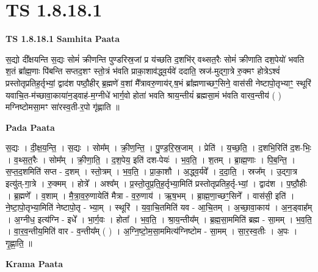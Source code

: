 \documentclass[17pt]{extarticle}
\begin{document}
\section{ TS 1.8.18.1 }

\textbf{TS 1.8.18.1 } \newline
\textbf{Samhita Paata} \newline

स॒द्यो दी᳚क्षयन्ति स॒द्यः सोमं॑ क्रीणन्ति पुण्डरिस्र॒जां प्र य॑च्छति द॒शभि॑र् वथ्सत॒रैः सोमं॑ क्रीणाति दश॒पेयो॑ भवति श॒तं ब्रा᳚ह्म॒णाः पि॑बन्ति सप्तद॒शꣳ स्तो॒त्रं भ॑वति प्राका॒शाव॑द्ध्व॒र्यवे॑ ददाति॒ स्रज॑-मुद्गा॒त्रे रु॒क्मꣳ होत्रेऽश्वं॑ प्रस्तोतृप्रतिह॒र्तृभ्यां॒ द्वाद॑श पष्ठौ॒हीर् ब्र॒ह्मणे॑ व॒शां मै᳚त्रावरु॒णाय॑र्.ष॒भं ब्रा᳚ह्मणाच्छꣳ॒॒सिने॒ वास॑सी नेष्टापो॒तृभ्याꣳ॒॒ स्थूरि॑ यवाचि॒त-म॑च्छावा॒काया॑न॒ड्वाह॑-म॒ग्नीधे॑ भार्ग॒वो होता॑ भवति श्राय॒न्तीयं॑ ब्रह्मसा॒मं भ॑वति वारव॒न्तीय॑ ( ) मग्निष्टोमसा॒मꣳ सा॑रस्व॒ती-र॒पो गृ॑ह्णाति ॥ \newline

\textbf{Pada Paata} \newline

स॒द्यः । दी॒क्ष॒य॒न्ति॒ । स॒द्यः । सोम᳚म् । क्री॒ण॒न्ति॒ । पु॒ण्ड॒रि॒स्र॒जाम् । प्रेति॑ । य॒च्छ॒ति॒ । द॒शभि॒रिति॑ द॒श-भिः॒ । व॒थ्स॒त॒रैः । सोम᳚म् । क्री॒णा॒ति॒ । द॒श॒पेय॒ इति॑ दश-पेयः॑ । भ॒व॒ति॒ । श॒तम् । ब्रा॒ह्म॒णाः । पि॒ब॒न्ति॒ । स॒प्त॒द॒शमिति॑ सप्त - द॒शम् । स्तो॒त्रम् । भ॒व॒ति॒ । प्रा॒का॒शौ । अ॒द्ध्व॒र्यवे᳚ । द॒दा॒ति॒ । स्रज᳚म् । उ॒द्गा॒त्र इत्यु॑त्-गा॒त्रे । रु॒क्मम् । होत्रे᳚ । अश्व᳚म् । प्र॒स्तो॒तृ॒प्र॒ति॒ह॒र्तृभ्या॒मिति॑ प्रस्तोतृप्रतिह॒र्तृ-भ्यां॒ । द्वाद॑श । प॒ष्ठौ॒हीः । ब्र॒ह्मणे᳚ । व॒शाम् । मै॒त्रा॒व॒रु॒णायेति॑ मैत्रा - व॒रु॒णाय॑ । ऋ॒ष॒भम् । ब्रा॒ह्म॒णा॒च्छꣳ॒॒सिने᳚ । वास॑सी॒ इति॑ । ने॒ष्टा॒पो॒तृभ्या॒मिति॑ नेष्टापो॒तृ - भ्या॒म् । स्थूरि॑ । य॒वा॒चि॒तमिति॑ यव - आ॒चि॒तम् । अ॒च्छा॒वा॒काय॑ । अ॒न॒ड्वाह᳚म् । अ॒ग्नीध॒ इत्य॑ग्नि - इधे᳚ । भा॒र्ग॒वः । होता᳚ । भ॒व॒ति॒ । श्रा॒य॒न्तीय᳚म् । ब्र॒ह्म॒सा॒ममिति॑ ब्रह्म - सा॒मम् । भ॒व॒ति॒ । वा॒र॒व॒न्तीय॒मिति॑ वार - व॒न्तीय᳚म् ( ) । अ॒ग्नि॒ष्टो॒म॒सा॒ममित्य॑ग्निष्टोम - सा॒मम् । सा॒र॒स्व॒तीः । अ॒पः । गृ॒ह्णा॒ति॒ ॥  \newline


\textbf{Krama Paata} \newline
\end{document}
